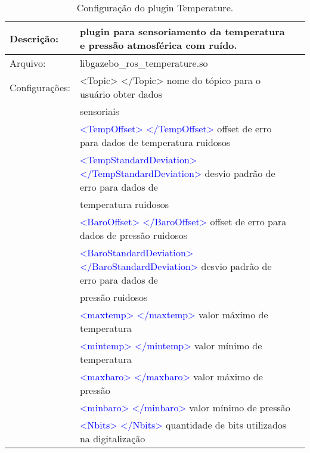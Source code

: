 			\begin{table}[h]
			\centering			
			\begin{tabular}{|r|lr|}
			\hline
			\multicolumn{1}{|l|}{Descrição: } & plugin para sensoriamento da temperatura e pressão atmosférica com ruído. &        \\
			\hline
			\multicolumn{1}{|l|}{Arquivo: } & libgazebo\_ros\_temperature.so &        \\
			\hline
			\multicolumn{1}{|l|}{Configurações:} & <Topic> </Topic> nome do tópico para o usuário obter dados  &         \\
			&  sensoriais &        \\
			& \textcolor{blue}{<TempOffset> </TempOffset>} offset de erro para dados de temperatura ruidosos &        \\
			& \textcolor{blue}{<TempStandardDeviation> </TempStandardDeviation>} desvio padrão de erro para dados de &         \\
			& temperatura ruidosos &         \\
			& \textcolor{blue}{<BaroOffset> </BaroOffset>} offset de erro para dados de pressão ruidosos &        \\
			& \textcolor{blue}{<BaroStandardDeviation> </BaroStandardDeviation>} desvio padrão de erro para dados de &         \\
			& pressão ruidosos &         \\
			& \textcolor{blue}{<maxtemp> </maxtemp>} valor máximo de temperatura &    \\
			& \textcolor{blue}{<mintemp> </mintemp>} valor mínimo de temperatura & \\
			& \textcolor{blue}{<maxbaro> </maxbaro>} valor máximo de pressão &      \\
			& \textcolor{blue}{<minbaro> </minbaro>} valor mínimo de pressão &      \\
			& \textcolor{blue}{<Nbits> </Nbits>} quantidade de bits utilizados na digitalização &     \\
			\hline
			\end{tabular}%
			\caption{Configuração do plugin Temperature.}
			\label{tab:temperature}%
			\end{table}%
